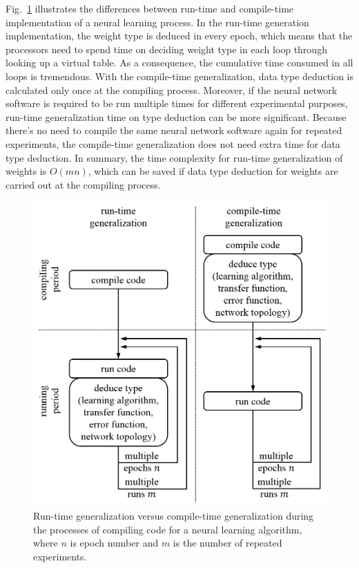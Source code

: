 \documentclass[procedia]{easychair}
\begin{document}
Fig.~\ref{fig:run_vs_compile} illustrates the differences between run-time and compile-time implementation of a neural learning process.  In the run-time generation implementation, the weight type is deduced in every epoch, which means that the processors need to spend time on deciding weight type in each loop through looking up a virtual table.  As a consequence, the cumulative time consumed in all loops is tremendous.  With the compile-time generalization, data type deduction is calculated only once at the compiling process.  Moreover, if the neural network software is required to be run multiple times for different experimental purposes, run-time generalization time on type deduction can be more significant.  Because there’s no need to compile the same neural network software again for repeated experiments, the compile-time generalization does not need extra time for data type deduction.  In summary, the time complexity for run-time generalization of weights is $O(mn)$, which can be saved if data type deduction for weights are carried out at the compiling process.

\begin{figure}[tb]
    \begin{centering}
        \includegraphics[scale=0.5]{../pic/run_vs_compile.png}
        \caption{Run-time generalization versus compile-time generalization during the processes of compiling code for a neural learning algorithm, where $n$ is epoch number and $m$ is the number of repeated experiments.}
        \label{fig:run_vs_compile}
	\end{centering}
\end{figure}
\end{document}
